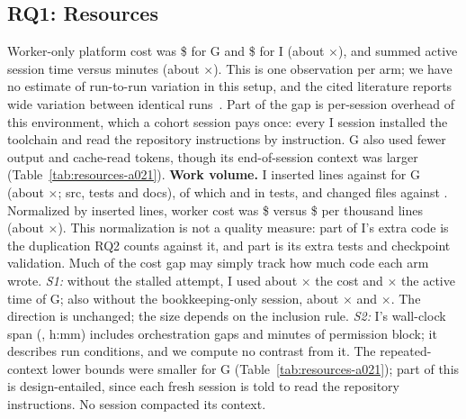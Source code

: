 \documentclass[10pt,conference]{IEEEtran}
\newcommand{\G}{G}
\newcommand{\I}{I}
\begin{document}
\subsection{RQ1: Resources}
Worker-only platform cost was \$\AcostGrouped{} for \G{} and \$\AcostIndep{} for \I{} (about \AcostRatio$\times$), and summed active session time \AactiveMinGrouped{} versus \AactiveMinIndep{} minutes (about \AactiveRatio$\times$). This is one observation per arm; we have no estimate of run-to-run variation in this setup, and the cited literature reports wide variation between identical runs~\cite{bai2026tokens}. %
Part of the gap is per-session overhead of this environment, which a cohort session pays once: every \I{} session installed the toolchain and read the repository instructions by instruction. %
\G{} also used fewer output and cache-read tokens, though its end-of-session context was larger (Table~\ref{tab:resources-a021}). %
\textbf{Work volume.} \I{} inserted \AinsLinesIndep{} lines against \AinsLinesGrouped{} for \G{} (about \AinsLinesRatio$\times$; src, tests and docs), of which \AinsTestLinesIndep{} and \AinsTestLinesGrouped{} in tests, and changed \AfilesChangedIndep{} files against \AfilesChangedGrouped. Normalized by inserted lines, worker cost was \$\AcostPerKLineIndep{} versus \$\AcostPerKLineGrouped{} per thousand lines (about \AcostPerLineRatio$\times$). This normalization is not a quality measure: part of \I's extra code is the duplication RQ2 counts against it, and part is its extra tests and checkpoint validation. Much of the cost gap may simply track how much code each arm wrote. %
\emph{S1:} without the stalled attempt, \I{} used about \AcostExclStalledRatio$\times$ the cost and \AactiveExclStalledRatio$\times$ the active time of \G; also without the bookkeeping-only session, about \AcostExclNoCodeRatio$\times$ and \AactiveExclNoCodeRatio$\times$. The direction is unchanged; the size depends on the inclusion rule. %
\emph{S2:} \I's wall-clock span (\AspanHmIndep{}, h:mm) includes orchestration gaps and \AblockedMinIndep{} minutes of permission block; it describes run conditions, and we compute no contrast from it. %
The repeated-context lower bounds were smaller for \G{} (Table~\ref{tab:resources-a021}); part of this is design-entailed, since each fresh session is told to read the repository instructions. No session compacted its context. %


\end{document}
